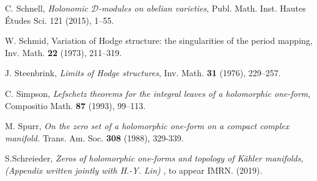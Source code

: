 \documentclass[a4paper,12pt,reqno]{amsart}
\theoremstyle{plain}
\theoremstyle{remark}
\begin{document}
\begin{thebibliography}{HKLR}
C. Schnell, {\it  Holonomic $\mathcal{D}$-modules on abelian varieties},
Publ. Math. Inst. Hautes \'{E}tudes Sci. 121 (2015), 1--55.

 W. Schmid, Variation of Hodge structure: the singularities of the period mapping, Inv. Math. \textbf{22} (1973), 211--319.

 J. Steenbrink, \textit{Limits of Hodge structures}, Inv. Math. \textbf{31} (1976), 229--257.




 C. Simpson, \textit{Lefschetz theorems for the integral leaves of a holomorphic one-form}, Compositio Math. \textbf{87} (1993), 99--113.

 M. Spurr, {\it On the zero set of a holomorphic one-form on a compact complex manifold.} Trans. Am.
Soc. \textbf{308} (1988), 329-339. 


 S.Schreieder, \textit{Zeros of holomorphic one-forms and topology of K\"ahler manifolds, (Appendix written jointly with H.-Y. Lin) }, to appear IMRN. (2019).


\end{thebibliography}
\end{document}
